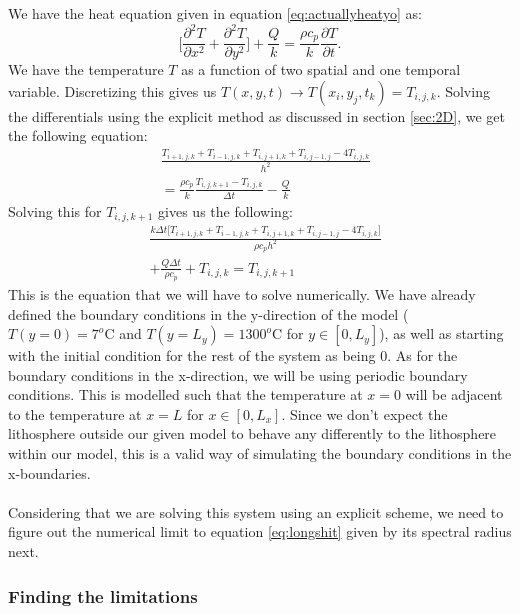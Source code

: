 \documentclass[reprint,english,notitlepage]{revtex4-1}  %
\begin{document}
We have the heat equation given in equation \ref{eq:actuallyheatyo} as:
\begin{equation}
    \Bigg[\frac{\partial^2 T}{\partial x^2} + \frac{\partial^2 T}{\partial y^2}\Bigg] + \frac{Q}{k} = \frac{\rho c_p}{k} \frac{\partial T}{\partial t}.
\end{equation}
We have the temperature $T$ as a function of two spatial and one temporal variable. Discretizing this gives us $T(x,y,t) \rightarrow T(x_i,y_j,t_k) = T_{i,j,k}$. Solving the differentials using the explicit method as discussed in section \ref{sec:2D}, we get the following equation:
\begin{equation}
    \begin{split}
        &\frac{T_{i+1,j,k} + T_{i-1,j,k} + T_{i,j+1,k} + T_{i,j-1,j} - 4T_{i,j,k}}{h^2}\\ &= \frac{\rho c_p}{k}\frac{T_{i,j,k+1} - T_{i,j,k}}{\Delta t} - \frac{Q}{k}
    \end{split}
\end{equation}
Solving this for $T_{i,j,k+1}$ gives us the following:
\begin{equation}\label{eq:longshit}
    \begin{split}
        &\frac{k\Delta t\Big[T_{i+1,j,k} + T_{i-1,j,k} + T_{i,j+1,k} + T_{i,j-1,j} - 4T_{i,j,k}\Big]}{\rho c_ph^2}\\ &+ \frac{Q\Delta t}{\rho c_p} + T_{i,j,k} = T_{i,j,k+1}
    \end{split}
\end{equation}
This is the equation that we will have to solve numerically. We have already defined the boundary conditions in the y-direction of the model ($T(y=0) = 7^o\text{C}$ and $T(y=L_{y}) = 1300^o\text{C}$ for $y\in[0,L_{y}]$), as well as starting with the initial condition for the rest of the system as being $0$. As for the boundary conditions in the x-direction, we will be using periodic boundary conditions. This is modelled such that the temperature at $x=0$ will be adjacent to the temperature at $x=L$ for $x\in[0,L_{x}]$. Since we don't expect the lithosphere outside our given model to behave any differently to the lithosphere within our model, this is a valid way of simulating the boundary conditions in the x-boundaries.
\\
\\
Considering that we are solving this system using an explicit scheme, we need to figure out the numerical limit to equation \ref{eq:longshit} given by its spectral radius next.

\subsubsection{Finding the limitations}
\end{document}

